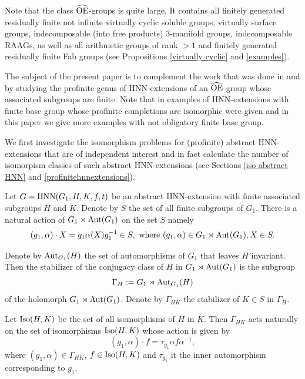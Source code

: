 \documentclass[a4paper,12pt]{article}
\newcommand{\Oe}{\rm \widehat{OE}}
\def\aut {{\rm Aut}}
\def\out {{\rm Out}}
\def\hnn {{\rm HNN}}
\def\Iso {{\rm Iso}}
\begin{document}
Note that the class $\Oe$-groups is quite large. It contains all finitely generated residually finite not infinite virtually cyclic soluble groups, virtually surface  groups, indecomposable (into free products) 3-manifold groups,  indecomposable RAAGs, as well as all arithmetic groups of rank $>1$ and finitely generated residually finite Fab groups (see Propositions \ref{virtually cyclic} and \ref{examples}). 

 

The subject of the present paper is to complement the work that was done in \cite{BPZ2} and  \cite{BPZ} by studying the profinite genus of HNN-extensions of an $\Oe$-group whose associated subgroups are finite. Note that 
in \cite{BZ} examples of HNN-extensions with finite base group whose profinite completions are isomorphic were given and in this paper we give more examples with not obligatory finite base group. 



We first investigate the isomorphism problems for (profinite) abstract HNN-extensions that are of independent interest and in fact calculate the number of isomorpism classes of such abstract HNN-extensions (see Sections \ref{iso abstract HNN} and \ref{profinitehnnextensions}). 

Let $G=\hnn(G_1, H, K, f, t)$ be an abstract HNN-extension with finite associated subgroups $H$ and $K$.  Denote by $S$ the set of all finite subgroups of $G_1$. There is a natural action of $G_1\rtimes \aut(G_1)$ on the set $S$ namely \begin{equation} (g_1,\alpha)\cdot X= g_1\alpha(X)g_1^{-1} \in S, \mbox{ where } (g_1,\alpha) \in G_1\rtimes \aut(G_1), X \in S. \end{equation}



Denote by  $\aut_{G_1}(H)$  the set of automorphisms of $G_1$ that leaves $H$ invariant. %
Then the stabilizer of the conjugacy class of $H$ in $G_1\rtimes \aut(G_1)$ is the subgroup
\begin{equation} \Gamma_H:=G_1 \rtimes \aut_{G_1}(H)\end{equation}  of the holomorph $G_1\rtimes \aut(G_1)$. 
Denote by $\Gamma_{HK}$  the stabilizer of $K\in S$ in $\Gamma_H$. 
 
 Let $\Iso(H, K)$ be the set of all isomorphisms of $H$ in $K.$ Then $\Gamma_{HK}$ acts naturally on the set of isomorphisms $\Iso(H,K)$  whose action is given by $$(g_1,\alpha) \cdot f=\tau_{g_1} \alpha f \alpha^{-1},$$ 
 where $(g_1,\alpha) \in \Gamma_{HK}$,  $f \in \Iso(H, K)$ and $\tau_{g_1}$ it the inner automorphism corresponding to $g_1$.   
 
\end{document}
